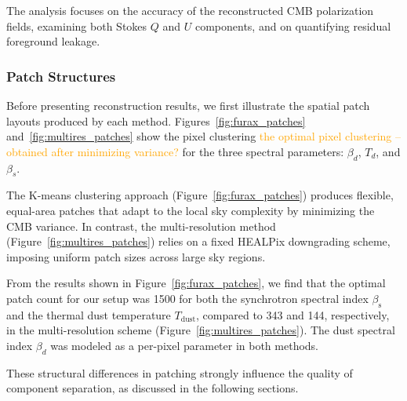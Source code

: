 \documentclass[fleqn,usenatbib]{mnras}
\newcommand{\je}[1]{\textcolor{orange}{#1}}
\begin{document}
The analysis focuses on the accuracy of the reconstructed CMB polarization fields, examining both Stokes \( Q \) and \( U \) components, and on quantifying residual foreground leakage.

\vspace{2mm}

\subsubsection*{Patch Structures}
Before presenting reconstruction results, we first illustrate the spatial patch layouts produced by each method. Figures~\ref{fig:furax_patches} and~\ref{fig:multires_patches} show the pixel clustering \je{the optimal pixel clustering -- obtained after minimizing variance?} for the three spectral parameters: \( \beta_d \), \( T_d \), and \( \beta_s \).

The K-means clustering approach (Figure~\ref{fig:furax_patches}) produces flexible, equal-area patches that adapt to the local sky complexity by minimizing the CMB variance. In contrast, the multi-resolution method (Figure~\ref{fig:multires_patches}) relies on a fixed HEALPix downgrading scheme, imposing uniform patch sizes across large sky regions.

From the results shown in Figure~\ref{fig:furax_patches}, we find that the optimal patch count for our setup was 1500 for both the synchrotron spectral index \( \beta_{\mathrm{s}} \) and the thermal dust temperature \( T_{\mathrm{dust}} \), compared to 343 and 144, respectively, in the multi-resolution scheme (Figure~\ref{fig:multires_patches}). The dust spectral index \( \beta_d \) was modeled as a per-pixel parameter in both methods.

These structural differences in patching strongly influence the quality of component separation, as discussed in the following sections.
\end{document}
